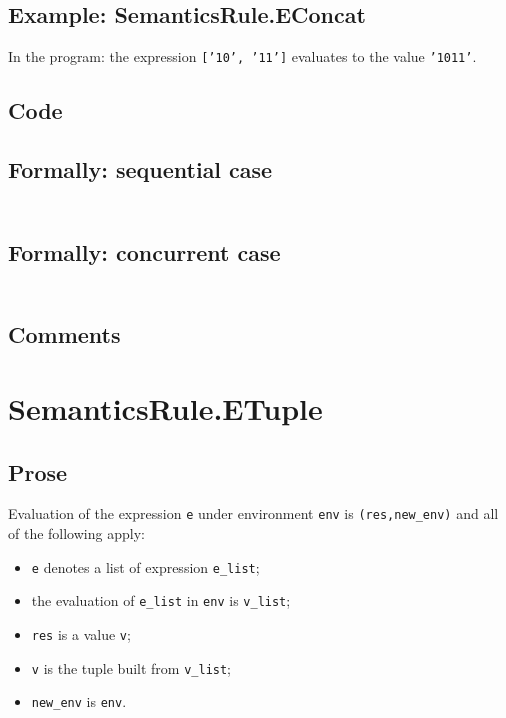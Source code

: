 \documentclass{book}
\begin{document}
  \subsection{Example: SemanticsRule.EConcat}
    In the program:
    the expression \texttt{['10', '11']} evaluates to the value \texttt{'1011'}.

  \subsection{Code}

  \subsection{Formally: sequential case}
  \begin{align}
  \end{align} 

  \subsection{Formally: concurrent case}
  \begin{align}
  \end{align} 

  \subsection{Comments}

\section{SemanticsRule.ETuple \label{sec:SemanticsRule.ETuple}}

  \subsection{Prose}
  Evaluation of the expression \texttt{e} under environment \texttt{env} is
  \texttt{(res,new\_env)} and all of the following apply:
  \begin{itemize}
  \item \texttt{e} denotes a list of expression \texttt{e\_list};
  \item the evaluation of \texttt{e\_list} in \texttt{env} is \texttt{v\_list};
  \item \texttt{res} is a value \texttt{v};
  \item \texttt{v} is the tuple built from \texttt{v\_list};
  \item \texttt{new\_env} is \texttt{env}.
  \end{itemize}
\end{document}

